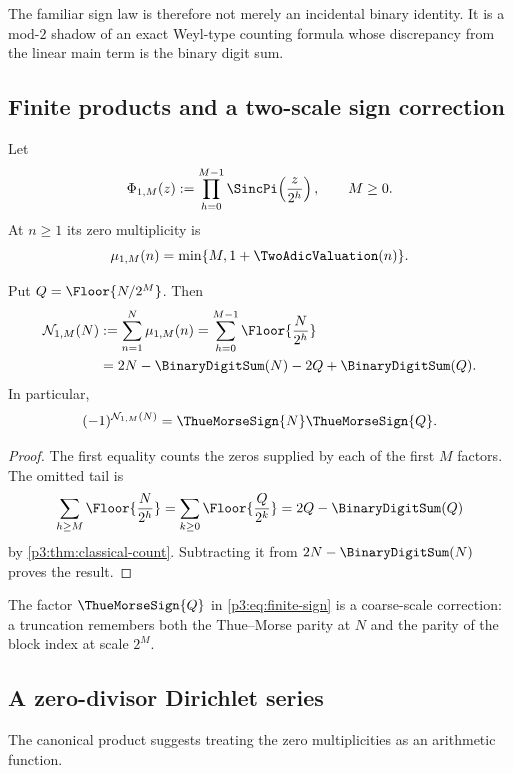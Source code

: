 \documentclass[11pt,oneside]{article}
\theoremstyle{definition}
\theoremstyle{remark}
\begin{document}
\begin{remark}
The familiar sign law is therefore not merely an incidental binary identity.  It is a mod-$2$ shadow of an exact Weyl-type counting formula whose discrepancy from the linear main term is the binary digit sum.
\end{remark}

\subsection{Finite products and a two-scale sign correction}

Let
\[
  \Phi_{1,M}(z):=\prod_{h=0}^{M-1}\SincPi\!\left(\frac z{2^h}\right),
  \qquad M\ge0.
\]
At $n\ge1$ its zero multiplicity is
\[
  \mu_{1,M}(n)=\min\{M,1+\TwoAdicValuation(n)\}.
\]

\begin{proposition}\label{p3:prop:finite-classical}
Put $Q=\Floor{N/2^M}$.  Then
\begin{align}
 \mathcal N_{1,M}(N)
 &:=\sum_{n=1}^{N}\mu_{1,M}(n)
   =\sum_{h=0}^{M-1}\Floor{\frac N{2^h}}\label{p3:eq:finite-count-floor}\\
 &=2N-\BinaryDigitSum(N)-2Q+\BinaryDigitSum(Q).\label{p3:eq:finite-count-digital}
\end{align}
In particular,
\begin{equation}\label{p3:eq:finite-sign}
  (-1)^{\mathcal N_{1,M}(N)}
  =\ThueMorseSign{N}\ThueMorseSign{Q}.
\end{equation}
\end{proposition}

\begin{proof}
The first equality counts the zeros supplied by each of the first $M$ factors.  The omitted tail is
\[
 \sum_{h\ge M}\Floor{\frac N{2^h}}
 =\sum_{k\ge0}\Floor{\frac Q{2^k}}
 =2Q-\BinaryDigitSum(Q)
\]
by \cref{p3:thm:classical-count}.  Subtracting it from $2N-\BinaryDigitSum(N)$ proves the result.
\end{proof}

The factor $\ThueMorseSign{Q}$ in \eqref{p3:eq:finite-sign} is a coarse-scale correction: a truncation remembers both the Thue--Morse parity at $N$ and the parity of the block index at scale $2^M$.

\subsection{A zero-divisor Dirichlet series}

The canonical product suggests treating the zero multiplicities as an arithmetic function.
\end{document}
